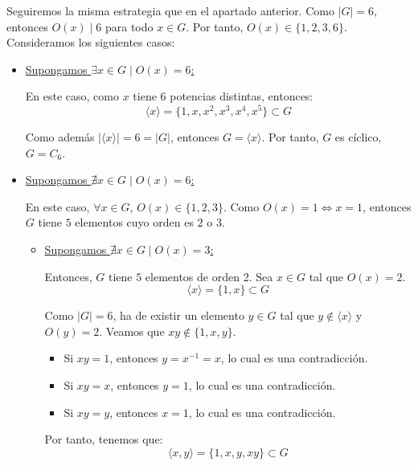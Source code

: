 \begin{ejercicio}
\begin{enumerate}
        Seguiremos la misma estrategia que en el apartado anterior. Como $|G|=6$, entonces $O(x)\mid 6$ para todo $x\in G$. Por tanto, $O(x)\in \{1,2,3,6\}$. Consideramos los siguientes casos:
        \begin{itemize}
            \item \ul{Supongamos $\exists x\in G\mid O(x)=6$:}
            
            En este caso, como $x$ tiene 6 potencias distintas, entonces:
            \begin{equation*}
                \langle x\rangle = \{1,x,x^2,x^3,x^4,x^5\}\subset G
            \end{equation*}

            Como además $|\langle x\rangle|=6=|G|$, entonces $G=\langle x\rangle$. Por tanto, $G$ es cíclico, $G=C_6$.

            \item \ul{Supongamos $\nexists x\in G\mid O(x)=6$:}
            
            En este caso, $\forall x\in G$, $O(x)\in\{1,2,3\}$. Como $O(x)=1\iff x=1$, entonces $G$ tiene $5$ elementos cuyo orden es $2$ o $3$.
            \begin{itemize}
                \item \ul{Supongamos $\nexists x\in G\mid O(x)=3$:}
                
                Entonces, $G$ tiene $5$ elementos de orden 2. Sea $x\in G$ tal que $O(x)=2$.
                \begin{equation*}
                    \langle x\rangle = \{1,x\}\subset G
                \end{equation*}

                Como $|G|=6$, ha de existir un elemento $y\in G$ tal que $y\notin\langle x\rangle$ y $O(y)=2$. Veamos que $xy\notin \{1,x,y\}$.
                \begin{itemize}
                    \item Si $xy=1$, entonces $y=x^{-1}=x$, lo cual es una contradicción.
                    \item Si $xy=x$, entonces $y=1$, lo cual es una contradicción.
                    \item Si $xy=y$, entonces $x=1$, lo cual es una contradicción.
                \end{itemize}
                Por tanto, tenemos que:
                \begin{equation*}
                    \langle x,y\rangle = \{1,x,y,xy\}\subset G
                \end{equation*}


\end{itemize}
\end{itemize}
\end{enumerate}
\end{ejercicio}
